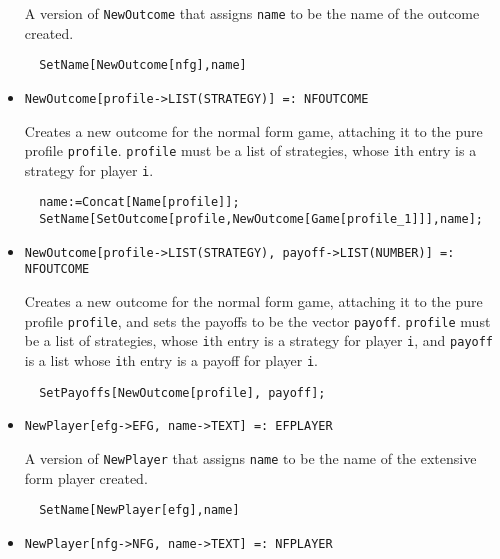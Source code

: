 \begin{itemize}
\bd 
A version of \verb+NewOutcome+ that assigns \verb+name+ to be the name
of the outcome created.  
\begin{verbatim}
  SetName[NewOutcome[nfg],name]
\end{verbatim} 
\ed

\item{}
\protect \large \begin{verbatim}
NewOutcome[profile->LIST(STRATEGY)] =: NFOUTCOME 
\end{verbatim}\normalsize

\bd 
Creates a new outcome for the normal form game, attaching it to
the pure profile \verb+profile+.  \verb+profile+ must be a list of
strategies, whose \verb+i+th entry is a strategy for player \verb+i+. 


\begin{verbatim}
  name:=Concat[Name[profile]];
  SetName[SetOutcome[profile,NewOutcome[Game[profile_1]]],name];
\end{verbatim} 
\ed

\item{}
\protect \large \begin{verbatim}
NewOutcome[profile->LIST(STRATEGY), payoff->LIST(NUMBER)] =: NFOUTCOME 
\end{verbatim}\normalsize
 
\bd 
Creates a new outcome for the normal form game, attaching it to
the pure profile \verb+profile+, and sets the payoffs to be the vector
\verb+payoff+.  \verb+profile+ must be a list of strategies, whose
\verb+i+th entry is a strategy for player \verb+i+, and \verb+payoff+
is a list whose \verb+i+th entry is a payoff for player \verb+i+.

\begin{verbatim}
  SetPayoffs[NewOutcome[profile], payoff];
\end{verbatim} 
\ed


\item{}
\protect \large \begin{verbatim}
NewPlayer[efg->EFG, name->TEXT] =: EFPLAYER 
\end{verbatim}\normalsize

\bd 
A version of \verb+NewPlayer+ that assigns \verb+name+ to be the name
of the extensive form player created.  
\begin{verbatim}
  SetName[NewPlayer[efg],name]
\end{verbatim} 
\ed

\item{}
\protect \large \begin{verbatim}
NewPlayer[nfg->NFG, name->TEXT] =: NFPLAYER 
\end{verbatim}\normalsize


\end{itemize}
